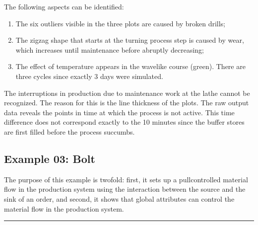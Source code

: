 \documentclass[letterpaper,10pt,english]{sphinxmanual}
\begin{document}
\sphinxAtStartPar
The following aspects can be identified:
\begin{enumerate}
%
\item {} 
\sphinxAtStartPar
The six outliers visible in the three plots are caused by broken drills;

\item {} 
\sphinxAtStartPar
The zigzag shape that starts at the turning process step is caused by wear, which increases until maintenance before
abruptly decreasing;

\item {} 
\sphinxAtStartPar
The effect of temperature appears in the wave\sphinxhyphen{}like course (green). There are three cycles since exactly 3 days were
simulated.

\end{enumerate}


\sphinxAtStartPar
The interruptions in production due to maintenance work at the lathe cannot be recognized. The reason for this is the
line thickness of the plots. The raw output data reveals the points in time at which the process is not active. This
time difference does not correspond exactly to the 10 minutes since the buffer stores are first filled before the
process succumbs.



\subsection{Example 03: Bolt}
\label{\detokenize{source/Examples/example03:example-03-bolt}}\label{\detokenize{source/Examples/example03:id1}}\label{\detokenize{source/Examples/example03::doc}}
\sphinxAtStartPar
The purpose of this example is twofold: first, it sets up a pull\sphinxhyphen{}controlled material flow in the production system
using the interaction between the source and the sink of an order, and second, it shows that global attributes can
control the material flow in the production system.


\bigskip\hrule\bigskip
\end{document}
